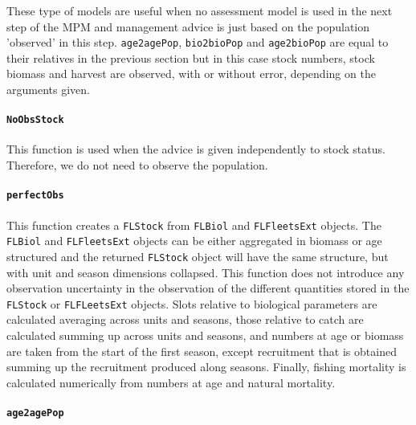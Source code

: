 These type of models are useful when no assessment model is used in the next step of the MPM and management
advice is just based on the population 'observed' in this step. \texttt{age2agePop}, \texttt{bio2bioPop}
and \texttt{age2bioPop} are equal to their relatives in the previous section but in this case
stock numbers, stock biomass and harvest are observed, with or without error, depending on the 
arguments given. 

\paragraph{\texttt{NoObsStock}} \hspace{0pt} \smallskip

  This function is used when the advice is given independently to stock status. Therefore, we do not need to observe the population.


\paragraph{\texttt{perfectObs}} \hspace{0pt} \smallskip

	This function creates a \texttt{FLStock} from \texttt{FLBiol} and \texttt{FLFleetsExt} objects. 
	The \texttt{FLBiol} and \texttt{FLFleetsExt} objects can be either aggregated in biomass or age structured
	and the returned \texttt{FLStock} object will have the same structure, but with unit and season dimensions collapsed.  
	This function does not introduce any observation uncertainty in the observation of the different 
	quantities stored in the \texttt{FLStock} or \texttt{FLFLeetsExt} objects. Slots relative to biological parameters are calculated
	averaging across units and seasons, those relative to catch are calculated summing up across units and seasons, and numbers at
	age or biomass are taken from the start of the first season, except recruitment that is obtained summing up 
	the recruitment produced along seasons. Finally, fishing mortality is calculated numerically from numbers at age and 
	natural mortality. 


\paragraph{\texttt{age2agePop}} \hspace{0pt} \smallskip

